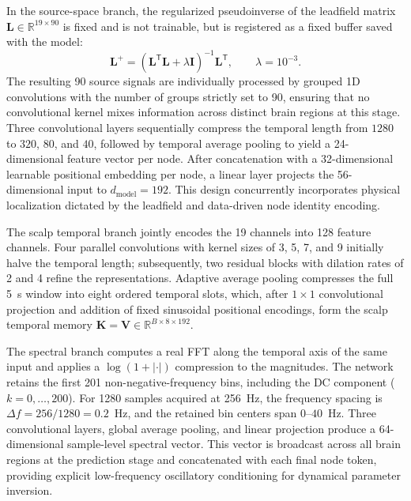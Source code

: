 \documentclass[11pt]{article}
\begin{document}
In the source-space branch, the regularized pseudoinverse of the leadfield matrix $\mathbf{L}\in\mathbb{R}^{19\times90}$ is fixed and is not trainable, but is registered as a fixed buffer saved with the model:
\begin{equation}
    \mathbf{L}^{+}=\left(\mathbf{L}^{\mathsf T}\mathbf{L}+\lambda\mathbf{I}\right)^{-1}\mathbf{L}^{\mathsf T},
    \qquad \lambda=10^{-3}.
    \tag{S2.2}
\end{equation}
The resulting 90 source signals are individually processed by grouped 1D convolutions with the number of groups strictly set to 90, ensuring that no convolutional kernel mixes information across distinct brain regions at this stage. Three convolutional layers sequentially compress the temporal length from $1280$ to $320$, $80$, and $40$, followed by temporal average pooling to yield a 24-dimensional feature vector per node. After concatenation with a 32-dimensional learnable positional embedding per node, a linear layer projects the 56-dimensional input to $d_{\mathrm{model}}=192$. This design concurrently incorporates physical localization dictated by the leadfield and data-driven node identity encoding.

The scalp temporal branch jointly encodes the 19 channels into 128 feature channels. Four parallel convolutions with kernel sizes of 3, 5, 7, and 9 initially halve the temporal length; subsequently, two residual blocks with dilation rates of 2 and 4 refine the representations. Adaptive average pooling compresses the full 5~s window into eight ordered temporal slots, which, after $1\times1$ convolutional projection and addition of fixed sinusoidal positional encodings, form the scalp temporal memory $\mathbf{K}=\mathbf{V}\in\mathbb{R}^{B\times8\times192}$.

The spectral branch computes a real FFT along the temporal axis of the same input and applies a $\log(1+|\cdot|)$ compression to the magnitudes. The network retains the first 201 non-negative-frequency bins, including the DC component ($k=0,\ldots,200$). For 1280 samples acquired at 256~Hz, the frequency spacing is $\Delta f=256/1280=0.2$~Hz, and the retained bin centers span $0$--$40$~Hz. Three convolutional layers, global average pooling, and linear projection produce a 64-dimensional sample-level spectral vector. This vector is broadcast across all brain regions at the prediction stage and concatenated with each final node token, providing explicit low-frequency oscillatory conditioning for dynamical parameter inversion.
\end{document}
